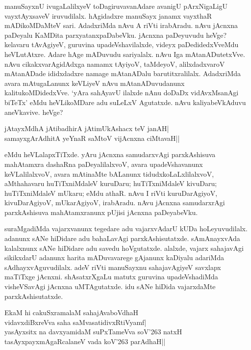 manuSayxnU ivugaLalilxyeV toDagiruvavanAdare avanigU pArxNigaLigU vayxtAyxsaveV iruvudilalx. hAgidadxre manuSayx janamx vayxthaR 
mADikoMDaMteV sari. AdadxriMda nAvu A riVti irabAradu. nAvu jAcnxna paDeyalu KaMDita parxyatanxpaDabeVku. jAcnxna paDeyuvudu heVge? kelavaru 
tAvAgiyeV, guruvina upadeVshavilalxde, videyx  paDedidedxVveMdu heVLutAtxre. Adare hAge mADuvudu sariyalalx. nAvu Iga mAtanADutetxVve. nAvu 
cikakxvarAgidAdxga namamx tAyiyoV, taMdeyoV, alilxdadxvaroV mAtanADade ididxdadxre namage mAtanADalu barutitxralilalx. AdadxriMda 
avara mAtugaLanunx keVLiyeV nAvu mAtanADuvudanunx kalitukoMDidedxVve. `yAra sahAyavU ilalxde nAnu doDaDx vidAvxMsanAgi biTeTx' eMdu 
heVLikoMDare adu suLeLxV Agutatxde. nAvu kaliyabeVkAduvu aneVkavive. heVge?

\begin{shloka}
jAtayxMdhA jAtibadhirA jAtimUkAshacx teV janAH|\\
samayxgArAdhitA yeYnaR saMtoV vijAcnxna ciMtavaH||
\end{shloka}

eMdu heVLalapxTiTxde. yAru jAcnxna samudarxvAgi parxkAshisuva mahAtamxra dashaRna paDeyalilalxvoV, avara upadeVshavanunx keVLalilalxvoV, 
avara mAtinaMte bALanunx tidudxkoLaLxlilalxvoV, aMthahavaru huTiTxniMdaleV kuruDaru; huTiTxniMdaleV kivuDaru; huTiTxniMdaleV 
mUkaru; eMdu athaR. nAvu I riVti kuruDarAgiyoV, kivuDarAgiyoV, mUkarAgiyoV, irabAradu. nAvu jAcnxna 
samudarxrAgi parxkAshisuva mahAtamxranunx pUjisi jAcnxna paDeyabeVku.

suraMgadiMda vajarxvanunx tegedare adu vajarxvAdarU kUDa hoLeyuvudilalx. adanunx sANe hiDidare adu bahaLavAgi parxkAshisutatxde. 
sAmAnayxvAda kalalxnunx sANe hiDidare adu savedu hoVgutatxde. alalxde, vajarx sahajavAgi sikikxdarU adanunx harita mADuvavarege gAjanunx 
kaDiyalu adariMda sAdhayxvAguvudilalx. adeV riVti manuSayxnu sahajavAgiyeV savxlapx maTiTxge jAcnxni. shAsatxrXgaLu matutx guruvina 
upadeVshadiMda visheVSavAgi jAcnxna uMTAgutatxde. idu sANe hiDida vajarxdaMte parxkAshisutatxde.

\begin{shloka}
EkaM hi cakuSxramalaM sahajAvaboVdhaH\\
vidavxdiBxreVva saha saMvasatidivxRtiVyamf|\\
yasAyxsitx na davxyamidaM suPxTameVva soV\char'263 natxH\\
tasAyxpayxmAgaRcalaneV vada koV\char'263 parAdhaH||
\end{shloka}

